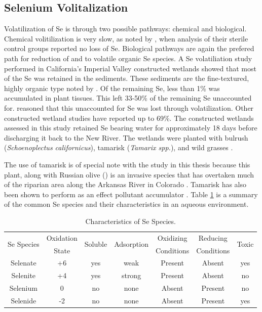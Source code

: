 \begin{linenumbers}[1]
\subsection*{Selenium Volitalization}
Volatilization of Se is through two possible pathways: chemical and biological.  Chemical volitilization is very slow, as noted by \citet{Besser1989}, when analysis of their sterile control groups reported no loss of Se. Biological pathways are again the prefered path for reduction of \selenate and \selenite to volatile organic Se species.  A Se volatiliation study performed in California's Imperial Valley constructed wetlands showed that most of the Se was retained in the sediments.  These sediments are the fine-textured, highly organic type noted by \citet{Besser1989}.  Of the remaining Se, less than 1\% was accumulated in plant tissues.  This left 33-50\% of the remaining Se unaccounted for.  \citet{Gersberg2006} reasoned that this unaccounted for Se was lost through volatilization.  Other constructed wetland studies have reported up to 69\%.  The constructed wetlands assessed in this study retained Se bearing water for approximately 18 days before discharging it back to the New River.  The wetlands were planted with bulrush (\textit{Schoenoplectus californicus}), tamarisk (\textit{Tamarix spp.}), and wild grasses \citep{Gersberg2006,johnson2009}.  

The use of tamarisk is of special note with the study in this thesis because this plant, along with Russian olive () is an invasive species that has overtaken much of the riparian area along the Arkansas River in Colorado \todoc.  Tamarisk has also been shown to perform as an effect pollutant accumulator \citep{Sorensen2009}. Table \ref{tab:SeSpeciesCharacteristics} is a summary of the common Se species and their characteristics in an aqueous environment.

\begin{table}[htbp]
\centering
\caption[Characteristics of Se Species.]{Characteristics of Se Species.}
\label{tab:SeSpeciesCharacteristics}
\begin{tabular}{ccccccc} 
\toprule
	\multirow{2}{*}{Se Species} & Oxidation & \multirow{2}{*}{Soluble} & \multirow{2}{*}{Adsorption} & Oxidizing & Reducing & \multirow{2}{*}{Toxic} \\
		& State &  & & Conditions & Conditions & \\ 
\midrule
	Selenate & +6 & yes & weak & Present & Absent & yes \\
	Selenite & +4 & yes & strong & Present & Absent & no \\
	Selenium & 0 & no & none & Absent & Present & no \\
	Selenide & -2 & no & none & Absent & Present & yes \\
\bottomrule
\end{tabular}
\end{table}


\end{linenumbers}
